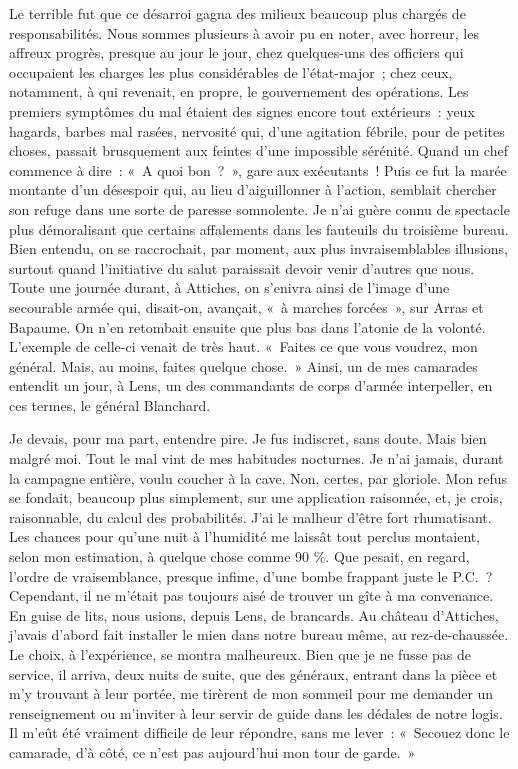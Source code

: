\documentclass[french,twoside]{book} %
\begin{document}
\noindent Le terrible fut que ce désarroi gagna des milieux beaucoup plus chargés de responsabilités. Nous sommes plusieurs à avoir pu en noter, avec horreur, les affreux progrès, presque au jour le jour, chez quelques-uns des officiers qui occupaient les charges les plus considérables de l’état-major ; chez ceux, notamment, à qui revenait, en propre, le gouvernement des opérations. Les premiers symptômes du mal étaient des signes encore tout extérieurs : yeux   hagards, barbes mal rasées, nervosité qui, d’une agitation fébrile, pour de petites choses, passait brusquement aux feintes d’une impossible sérénité. Quand un chef commence à dire : « A quoi bon ? », gare aux exécutants ! Puis ce fut la marée montante d’un désespoir qui, au lieu d’aiguillonner à l’action, semblait chercher son refuge dans une sorte de paresse somnolente. Je n’ai guère connu de spectacle plus démoralisant que certains affalements dans les fauteuils du troisième bureau. Bien entendu, on se raccrochait, par moment, aux plus invraisemblables illusions, surtout quand l’initiative du salut paraissait devoir venir d’autres que nous. Toute une journée durant, à Attiches, on s’enivra ainsi de l’image d’une secourable armée qui, disait-on, avançait, « à marches forcées », sur Arras et Bapaume. On n’en retombait ensuite que plus bas dans l’atonie de la volonté. L’exemple de celle-ci venait de très haut. « Faites ce que vous voudrez, mon général. Mais, au moins, faites quelque chose. » Ainsi, un de mes camarades entendit un jour, à Lens, un des commandants de corps d’armée interpeller, en ces termes, le général Blanchard.\par
Je devais, pour ma part, entendre pire. Je fus indiscret, sans doute. Mais bien malgré moi. Tout le mal vint de mes habitudes nocturnes. Je n’ai jamais, durant la campagne entière, voulu coucher à la cave. Non, certes, par gloriole. Mon refus se fondait, beaucoup plus simplement, sur une application raisonnée, et, je crois, raisonnable, du calcul des probabilités. J’ai le malheur d’être fort rhumatisant. Les chances pour qu’une nuit à l’humidité me laissât tout perclus montaient, selon mon estimation, à quelque chose comme 90 \%. Que pesait, en regard, l’ordre de vraisemblance, presque infime, d’une bombe frappant juste le P.C. ? Cependant, il ne m’était pas toujours aisé de trouver un gîte à ma convenance. En guise de lits, nous usions, depuis Lens, de brancards. Au château d’Attiches, j’avais d’abord fait installer le   mien dans notre bureau même, au rez-de-chaussée. Le choix, à l’expérience, se montra malheureux. Bien que je ne fusse pas de service, il arriva, deux nuits de suite, que des généraux, entrant dans la pièce et m’y trouvant à leur portée, me tirèrent de mon sommeil pour me demander un renseignement ou m’inviter à leur servir de guide dans les dédales de notre logis. Il m’eût été vraiment difficile de leur répondre, sans me lever : « Secouez donc le camarade, d’à côté, ce n’est pas aujourd’hui mon tour de garde. »\par
\end{document}
